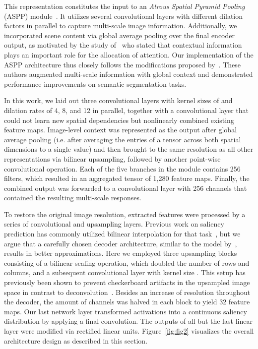 \documentclass[final,1p,times,number]{elsarticle}
\begin{document}
This representation constitutes the input to an \textit{Atrous Spatial Pyramid Pooling} (ASPP) module~\cite{chen2018deeplab}. It utilizes several convolutional layers with different dilation factors in parallel to capture multi-scale image information. Additionally, we incorporated scene content via global average pooling over the final encoder output, as motivated by the study of~\citet{torralba2006contextual} who stated that contextual information plays an important role for the allocation of attention. Our implementation of the ASPP architecture thus closely follows the modifications proposed by~\citet{chen2017rethinking}. These authors augmented multi-scale information with global context and demonstrated performance improvements on semantic segmentation tasks.

\newpage

In this work, we laid out three convolutional layers with kernel sizes of  and dilation rates of 4, 8, and 12 in parallel, together with a  convolutional layer that could not learn new spatial dependencies but nonlinearly combined existing feature maps. Image-level context was represented as the output after global average pooling (i.e. after averaging the entries of a tensor across both spatial dimensions to a single value) and then brought to the same resolution as all other representations via bilinear upsampling, followed by another point-wise convolutional operation. Each of the five branches in the module contains 256 filters, which resulted in an aggregated tensor of 1,280 feature maps. Finally, the combined output was forwarded to a  convolutional layer with 256 channels that contained the resulting multi-scale responses.

To restore the original image resolution, extracted features were processed by a series of convolutional and upsampling layers. Previous work on saliency prediction has commonly utilized bilinear interpolation for that task~\cite{Cornia2018PredictingHE,liu2018deep}, but we argue that a carefully chosen decoder architecture, similar to the model by~\citet{pan2017salgan}, results in better approximations. Here we employed three upsampling blocks consisting of a bilinear scaling operation, which doubled the number of rows and columns, and a subsequent convolutional layer with kernel size . This setup has previously been shown to prevent checkerboard artifacts in the upsampled image space in contrast to deconvolution~\cite{odena2016deconvolution}. Besides an increase of resolution throughout the decoder, the amount of channels was halved in each block to yield 32 feature maps. Our last network layer transformed activations into a continuous saliency distribution by applying a final  convolution. The outputs of all but the last linear layer were modified via rectified linear units. Figure~\ref{fig:fig2} visualizes the overall architecture design as described in this section.
\end{document}
